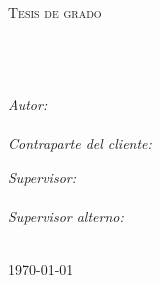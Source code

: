 \documentclass[11pt, a4paper, oneside]{Thesis} %
\begin{document}
\begin{titlepage}
\begin{center}

\textsc{\huge \tilsor}\\[2.0cm] %
\textsc{\huge \udelar}\\[1.5cm] %
\textsc{\LARGE \fing}\\[1.5cm] %
\textsc{\Large Tesis de grado}\\[0.5cm] %

\HRule \\[0.4cm] %
{\huge \bfseries \ttitle}\\[0.4cm] %
\HRule \\[1.5cm] %
 
\begin{minipage}{0.4\textwidth}
\begin{flushleft} \large
\emph{Autor:}\\
{\authornames}\\
\bigskip
\emph{Contraparte del cliente:}\\
{\fmolina} 
\end{flushleft}
\end{minipage}
\begin{minipage}{0.4\textwidth}
\begin{flushright} \large
\emph{Supervisor:} \\
{\gustun}\\
\bigskip
\emph{Supervisor alterno:} \\
{\marcelor}
\end{flushright}
\end{minipage}\\[3cm]
 
{\large \today}\\[4cm] %
 
\vfill
\end{center}

\end{titlepage}


\end{document}
